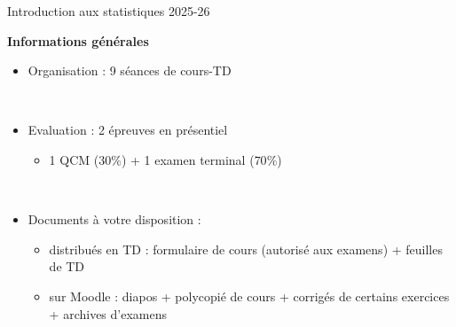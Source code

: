 \documentclass{beamer}
\begin{document}




\begin{frame}{Introduction aux statistiques 2025-26}{}

\begin{center}{\bf \Large Informations générales} \end{center}
\vspace{0.2cm}

\begin{itemize}

\item Organisation : 9 séances de cours-TD 

\

\item Evaluation : 2 épreuves en présentiel 
\begin{itemize}
\item 1 QCM ($30\%$) + 1 examen terminal ($70\%$) \\
\end{itemize}

\

\item Documents à votre disposition : 
\begin{itemize}
\item distribués en TD : formulaire de cours (autorisé aux examens) + feuilles de TD
\item sur Moodle : diapos + polycopié de cours + corrigés de certains exercices + archives d'examens 
\end{itemize}
\end{itemize}

\end{frame}
\end{document}
